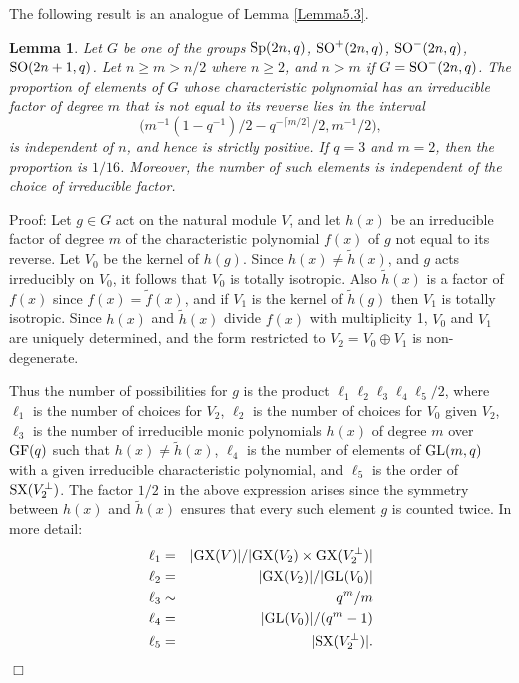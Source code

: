 \documentclass[12pt]{article}
\newtheorem{lemma}[definition]{Lemma}
\newenvironment{proof}{\normalsize {\sc Proof}:}{{\hfill $\Box$ \\}}
\def\SO{{\rm SO}}
\def\GL{{\rm GL}}
\def\GF{{\rm GF}}
\def\Sp{{\rm Sp}}
\def\SX{{\rm SX}}
\def\GX{{\rm GX}}
\def\ADD{Moreover, the number of such elements is
independent of the choice of irreducible factor.}
\begin{document}
The following result is an analogue of Lemma \ref{Lemma5.3}.
\begin{lemma}\label{Lemma5.8} 
Let $G$ be one of the groups 
$\Sp(2n,q)$, $\SO^+(2n,q)$, $\SO^-(2n,q)$, $\SO(2n+1,q)$.
Let $n\ge m>n/2$ where $n\ge2$, and $n>m$ if $G=\SO^-(2n,q)$.
The proportion of elements of
$G$ whose characteristic polynomial has an irreducible factor of degree $m$
that is not equal to its reverse 
lies in the interval 
$$\bigl(m^{-1}(1-q^{-1})/2-q^{-\lceil m/2\rceil}/2,m^{-1}/2\bigr),$$
is independent of $n$, and hence is strictly positive.
If $q=3$ and $m=2$, then the proportion is $1/16$.
\ADD
\end{lemma}
\begin{proof}
Let $g\in G$ act on the natural module $V$, and let
$h(x)$ be an irreducible factor of degree $m$
of the characteristic polynomial
$f(x)$ of $g$ not equal to its reverse. 
Let $V_0$ be the kernel of $h(g)$. Since    
$h(x)\ne \tilde{h}(x)$, and $g$ acts irreducibly on $V_0$,
it follows that $V_0$ is totally isotropic. Also
$\tilde{h}(x)$ is a factor of $f(x)$ since $f(x)=\tilde{f}(x)$,  
and if  $V_1$ is the kernel of
$\tilde{h}(g)$ then $V_1$ is totally isotropic. Since $h(x)$ and
$\tilde{h}(x)$ divide $f(x)$ with multiplicity 1, $V_0$ and $V_1$ are
uniquely determined, and the form restricted to $V_2=V_0\oplus V_1$ is
non-degenerate.

Thus the number of possibilities
for $g$ is the product $\ell_1\ell_2\ell_3\ell_4\ell_5/2$, where $\ell_1$ is
the number of choices for $V_2$, $\ell_2$ is the number of choices
for $V_0$ given $V_2$, $\ell_3$ is the number of irreducible monic 
polynomials $h(x)$ of degree $m$ over $\GF(q)$ such that $h(x)\ne
\tilde{h}(x)$, $\ell_4$ is the number of elements of $\GL(m,q)$ with a
given irreducible characteristic polynomial, and $\ell_5$ is the order of
$\SX(V_2^\perp)$. The factor $1/2$ in the above expression arises 
since the symmetry between $h(x)$ and $\tilde{h}(x)$ ensures 
that every such element $g$ is counted twice.
In more detail: 
\begin{eqnarray*}
\ell_1 & = & \vert \GX(V)\vert/\vert\GX(V_2)\times\GX(V_2^\perp)\vert \\
\ell_2 & = & \vert\GX(V_2)\vert/\vert\GL(V_0)\vert \\
\ell_3 & \sim & q^m/m \\
\ell_4 & = & \vert\GL(V_0)\vert/(q^m-1) \\
\ell_5 & = & \vert\SX(V_2^\perp)\vert. 
\end{eqnarray*}


\end{proof}
\end{document}
